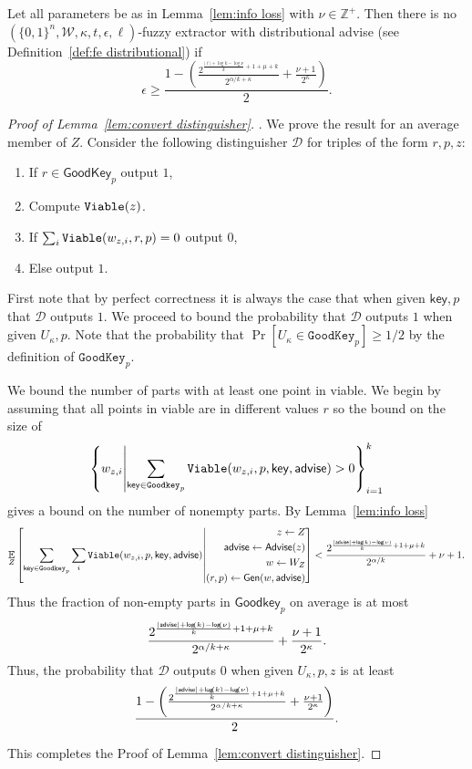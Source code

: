 \begin{lemma}
\label{lem:convert distinguisher}
Let all parameters be as in Lemma~\ref{lem:info loss} with $\nu \in\mathbb{Z}^+$.  Then there is no $(\{0,1\}^n, \mathcal{W}, \kappa, t, \epsilon, \ell)$-fuzzy extractor with distributional advise (see Definition~\ref{def:fe distributional}) if
\[
\epsilon\ge  \frac{1-\left(\frac{2^{\frac{|\ell|+\log{k}-\log{\nu}}{k}+1+\mu+k}}{{2^{\alpha/k+\kappa}}}+\frac{\nu+1}{2^\kappa}\right)}{2}.
\]
\end{lemma}
\begin{proof}[Proof of Lemma~\ref{lem:convert distinguisher}].
We prove the result for an average member of $Z$.  Consider the following distinguisher $\mathcal{D}$ for triples of the form $r, p, z$:
\begin{enumerate}
\item If $r \in \mathsf{GoodKey}_p$ output $1$,
\item Compute $\mathtt{Viable}(z)$.
\item If $\sum_{i} \mathtt{Viable}(w_{z, i}, r, p) =0 $ output $0$,
\item Else output $1$.
\end{enumerate}
First note that by perfect correctness it is always the case that when given $\mathsf{key}, p$ that $\mathcal{D}$ outputs $1$.  We proceed to bound the probability that $\mathcal{D}$ outputs $1$ when given $U_\kappa, p$.  Note that the probability that $\Pr[U_\kappa \in \mathtt{GoodKey}_p] \ge 1/2$ by the definition of $\mathtt{GoodKey}_p$. 

We bound the number of parts with at least one point in viable.  We begin by assuming that all points in viable are in different  values $r$ so the bound on the size of 
\[
\left\{w_{z, i} \middle|\sum_{\mathsf{key}\in\mathtt{Goodkey}_p} \mathtt{Viable}(w_{z,i}, p, \mathsf{key}, {\mathsf{advise}})>0\right\}_{i=1}^k 
\] 
gives a bound on the number of nonempty parts. By Lemma~\ref{lem:info loss} 
\[
\operatorname*{\mathbb{E}}_{Z} \left[\sum_{\mathsf{key} \in \mathtt{Goodkey}_p}\sum_{i }  \mathtt{Viable}(w_{z,i}, p, \mathsf{key}, {\mathsf{advise}}) \middle| \begin{aligned} z\leftarrow Z\\ {\mathsf{advise}}\leftarrow {\ensuremath{\mathsf{Advise}}}(z)\\w\leftarrow W_Z\\(r, p)\leftarrow {\ensuremath{\mathsf{Gen}}}(w, {\mathsf{advise}})\end{aligned} \right]< \frac{2^{\frac{|{\mathsf{advise}}|+\mathsf{log}\!\left(k\right)-\mathsf{log}\!\left(\nu\right)}{k}+1+\mu+k}}{{2^{\alpha/k}}}+\nu+1.
\]
Thus the fraction of non-empty parts in $\mathsf{Goodkey}_p$ on average is at most 
\[
\frac{2^{\frac{|{\mathsf{advise}}|+\mathsf{log}\!\left(k\right)-\mathsf{log}\!\left(\nu\right)}{k}+1+\mu+k}}{{2^{\alpha/k+\kappa}}}+\frac{\nu+1}{2^\kappa}.
\]
Thus, the probability that $\mathcal{D}$ outputs $0$ when given $U_\kappa, p, z$ is at least 
\[
\frac{1-\left(\frac{2^{\frac{|{\mathsf{advise}}|+\mathsf{log}\!\left(k\right)-\mathsf{log}\!\left(\nu\right)}{k}+1+\mu+k}}{{2^{\alpha/k+\kappa}}}+\frac{\nu+1}{2^\kappa}\right)}{2}.
\]

This completes the Proof of Lemma~\ref{lem:convert distinguisher}.
\end{proof}


